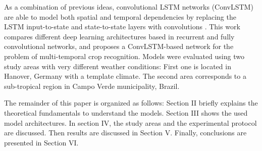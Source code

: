 As a  combination of previous ideas, convolutional LSTM networks (ConvLSTM) are able to model both spatial and temporal dependencies by replacing the LSTM input-to-state and state-to-state layers with convolutions \cite{xingjian2015convolutional}. This work compares different deep learning architectures based in recurrent and fully convolutional networks, and proposes a ConvLSTM-based network for the problem of multi-temporal crop recognition. Models were evaluated using two study areas with very different weather conditions: First one is located in Hanover, Germany with a template climate. The second area corresponds to a sub-tropical region in Campo Verde municipality, Brazil.

The remainder of this paper is organized as follows: Section II briefly explains the theoretical fundamentals to understand the models. Section III shows the used model architectures. In section IV, the study areas and the experimental protocol are discussed. Then results are discussed in Section V. Finally, conclusions are presented in Section VI.